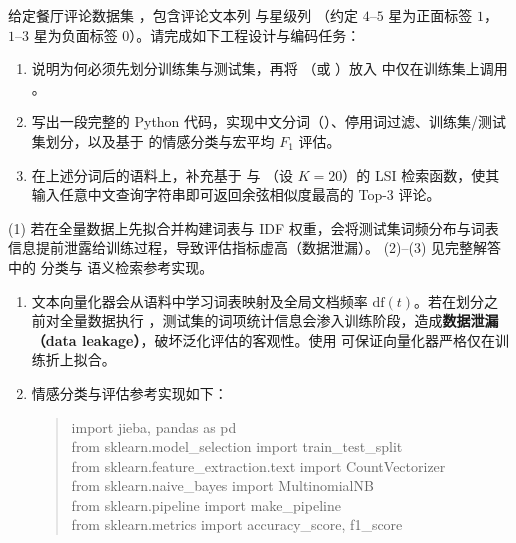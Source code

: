 \begin{exercise}[title={中文评论情感分类与 LSI 语义检索综合实践},level=advanced,points=20,tags={jieba,情感分析,TruncatedSVD}]\label{ex:ch07-pipeline-code}
给定餐厅评论数据集 ，包含评论文本列  与星级列 （约定 $4\text{--}5$ 星为正面标签 $1$，$1\text{--}3$ 星为负面标签 $0$）。请完成如下工程设计与编码任务：
\begin{enumerate}
  \item 说明为何必须先划分训练集与测试集，再将 （或 ）放入  中仅在训练集上调用 。
  \item 写出一段完整的 Python 代码，实现中文分词（）、停用词过滤、训练集/测试集划分，以及基于  的情感分类与宏平均 $F_1$ 评估。
  \item 在上述分词后的语料上，补充基于  与 （设 $K=20$）的 LSI 检索函数，使其输入任意中文查询字符串即可返回余弦相似度最高的 Top-3 评论。
\end{enumerate}
\begin{answer}
(1) 若在全量数据上先拟合并构建词表与 IDF 权重，会将测试集词频分布与词表信息提前泄露给训练过程，导致评估指标虚高（数据泄漏）。
(2)--(3) 见完整解答中的  分类与  语义检索参考实现。
\end{answer}
\begin{solution}
\begin{enumerate}
  \item 文本向量化器会从语料中学习词表映射及全局文档频率 $\mathrm{df}(t)$。若在划分之前对全量数据执行 ，测试集的词项统计信息会渗入训练阶段，造成\textbf{数据泄漏（data leakage）}，破坏泛化评估的客观性。使用  可保证向量化器严格仅在训练折上拟合。
  \item 情感分类与评估参考实现如下：
  \begin{quote}\ttfamily\small
  import jieba, pandas as pd\\
  from sklearn.model\_selection import train\_test\_split\\
  from sklearn.feature\_extraction.text import CountVectorizer\\
  from sklearn.naive\_bayes import MultinomialNB\\
  from sklearn.pipeline import make\_pipeline\\
  from sklearn.metrics import accuracy\_score, f1\_score\\[4pt]

\end{quote}
\end{enumerate}
\end{solution}
\end{exercise}
